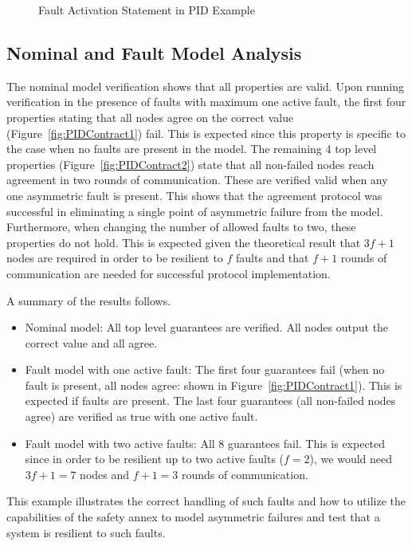 \begin{figure}[!htb]
        \caption{\label{fig:PID_faultActivationStmt} Fault Activation Statement in PID Example}
\end{figure}

\subsection{Nominal and Fault Model Analysis}
The nominal model verification shows that all properties are valid. Upon running verification in the presence of faults with maximum one active fault, the first four properties stating that all nodes agree on the correct value (Figure~\ref{fig:PIDContract1}) fail. This is expected since this property is specific to the case when no faults are present in the model. The remaining 4 top level properties (Figure~\ref{fig:PIDContract2}) state that all non-failed nodes reach agreement in two rounds of communication. These are verified valid when any one asymmetric fault is present. This shows that the agreement protocol was successful in eliminating a single point of asymmetric failure from the model. Furthermore, when changing the number of allowed faults to two, these properties do not hold. This is expected given the theoretical result that $3f+1$ nodes are required in order to be resilient to $f$ faults and that $f+1$ rounds of communication are needed for successful protocol implementation.

A summary of the results follows. 
\begin{itemize}
	\item Nominal model: All top level guarantees are verified. All nodes output the correct value and all agree. 
	\item Fault model with one active fault: The first four guarantees fail (when no fault is present, all nodes agree: shown in Figure~\ref{fig:PIDContract1}). This is expected if faults are present. The last four guarantees (all non-failed nodes agree) are verified as true with one active fault. 
	\item Fault model with two active faults: All 8 guarantees fail. This is expected since in order to be resilient up to two active faults ($f=2$), we would need $3f + 1 = 7$ nodes and $f+1 = 3$ rounds of communication. 
\end{itemize}

This example illustrates the correct handling of such faults and how to utilize the capabilities of the safety annex to model asymmetric failures and test that a system is resilient to such faults. 
